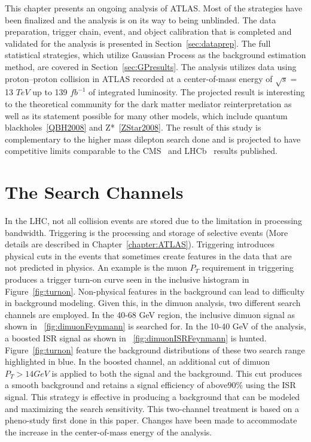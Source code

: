 This chapter presents an ongoing analysis of ATLAS. Most of the strategies have been finalized and the analysis is on its way to being unblinded. The data preparation, trigger chain, event, and object calibration that is completed and validated for the analysis is presented in Section~\ref{sec:dataprep}. The full statistical strategies, which utilize Gaussian Process as the background estimation method, are covered in Section~\ref{sec:GPresults}. The analysis utilizes data using proton--proton collision in ATLAS
recorded at a center-of-mass energy of $\sqrt{s}=$ 13 $TeV$ up to 139 $fb^{-1}$ of integrated luminosity. The projected result is interesting to the theoretical community for the dark matter mediator reinterpretation as well as its statement possible for many other models, which include quantum blackholes~\ref{QBH2008} and Z*~\ref{ZStar2008}. The result of this study is complementary to the higher mass dilepton search done and is projected to have competitive limits comparable to the CMS~\cite{CMS-PAS-EXO-19-018} and LHCb~\cite{Aaij:2722971} results published.

\section{The Search Channels}
In the LHC, not all collision events are stored due to the limitation in processing bandwidth. Triggering is the processing and storage of selective events (More details are described in Chapter~\ref{chapter:ATLAS}). Triggering introduces physical cuts in the events that sometimes create features in the data that are not predicted in physics. An example is the muon $P_{T}$ requirement in triggering produces a trigger turn-on curve seen in the inclusive histogram in Figure~\ref{fig:turnon}.
Non-physical features in the background can lead to difficulty in background modeling. Given this, in the dimuon analysis, two different search channels are employed. In the 40-68 GeV region, the inclusive dimuon signal as shown in ~\ref{fig:dimuonFeynmann} is searched for. In the 10-40 GeV of the analysis, a boosted ISR signal as shown in ~\ref{fig:dimuonISRFeynmann} is hunted. Figure~\ref{fig:turnon} feature the background distributions of these two search range highlighted in blue. In the
boosted channel, an additional cut of dimuon $P_{T}>14 GeV$ is applied to both the signal and the background. This cut produces a smooth background and retains a signal efficiency of above$ 90\%$ using the ISR signal. This strategy is effective in producing a background that can be modeled and maximizing the search sensitivity. 
This two-channel treatment is based on a pheno-study first done in this paper\cite{2014}. Changes have been made to accommodate the increase in the center-of-mass energy of the analysis. 

